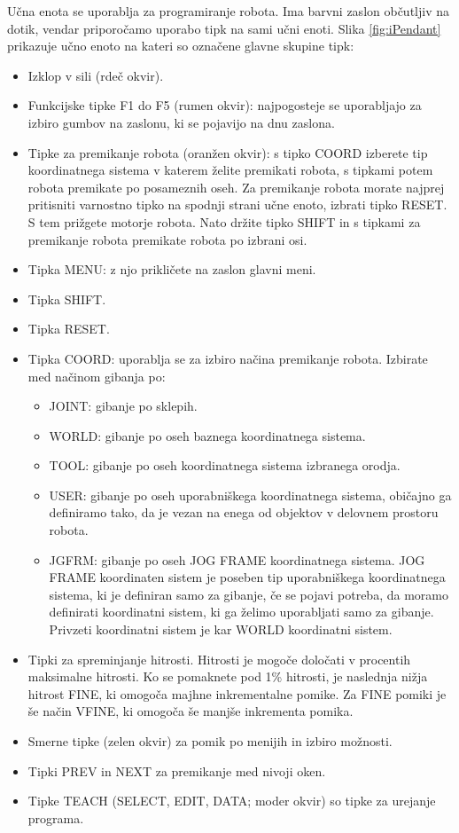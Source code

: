 Učna enota se uporablja za programiranje robota. Ima barvni zaslon občutljiv na dotik, vendar priporočamo uporabo tipk na sami učni enoti. 
Slika \ref{fig:iPendant} prikazuje učno enoto na kateri so označene glavne skupine tipk:

\begin{itemize}
	\item Izklop v sili (rdeč okvir).
	\item Funkcijske tipke F1 do F5 (rumen okvir): najpogosteje se uporabljajo za izbiro gumbov na zaslonu, ki se pojavijo na dnu zaslona.
	\item Tipke za premikanje robota (oranžen okvir): s tipko COORD izberete tip koordinatnega sistema v katerem želite premikati robota, s tipkami potem robota premikate po posameznih oseh. Za premikanje robota morate najprej pritisniti varnostno tipko na spodnji strani učne enoto, izbrati tipko RESET. S tem prižgete motorje robota. Nato držite tipko SHIFT in s tipkami za premikanje robota premikate robota po izbrani osi.
	\item Tipka MENU: z njo prikličete na zaslon glavni meni.
	\item Tipka SHIFT.
	\item Tipka RESET.
	\item Tipka COORD: uporablja se za izbiro načina premikanje robota. Izbirate med načinom gibanja po:
	\begin{itemize}
		\item JOINT: gibanje po sklepih.
		\item WORLD: gibanje po oseh baznega koordinatnega sistema.
		\item TOOL: gibanje po oseh koordinatnega sistema izbranega orodja.
		\item USER: gibanje po oseh uporabniškega koordinatnega sistema, običajno ga definiramo tako, da je vezan na enega od objektov v delovnem prostoru robota.
		\item JGFRM: gibanje po oseh JOG FRAME koordinatnega sistema. JOG FRAME koordinaten sistem je poseben tip uporabniškega koordinatnega sistema, ki je definiran samo za gibanje, če se pojavi potreba, da moramo definirati koordinatni sistem, ki ga želimo uporabljati samo za gibanje. Privzeti koordinatni sistem je kar WORLD koordinatni sistem.
	\end{itemize}
	\item Tipki za spreminjanje hitrosti. Hitrosti je mogoče določati v procentih maksimalne hitrosti. Ko se pomaknete pod 1\% hitrosti, je naslednja nižja hitrost FINE, ki omogoča majhne inkrementalne pomike. Za FINE pomiki je še način VFINE, ki omogoča še manjše inkrementa pomika.
	\item Smerne tipke (zelen okvir) za pomik po menijih in izbiro možnosti.
	\item Tipki PREV in NEXT  za premikanje med nivoji oken.
	\item Tipke TEACH (SELECT, EDIT, DATA; moder okvir) so tipke za urejanje programa.
\end{itemize}

